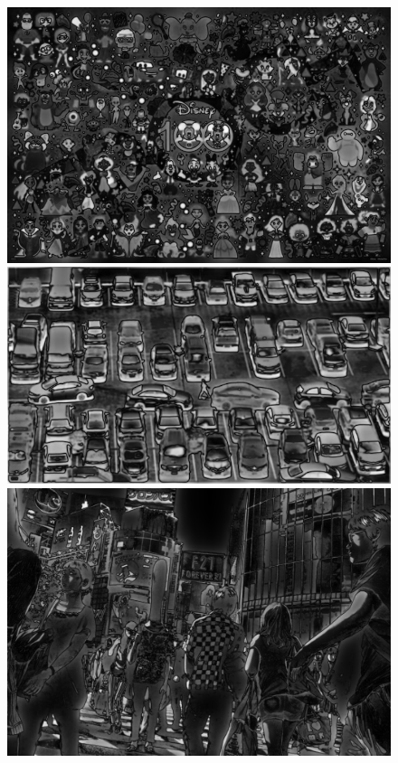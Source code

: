 \begin{figure}[H]
	\centering
	\begin{minipage}[b]{0.3\textwidth}
		\centering
		\includegraphics[width=\textwidth]{Graphics/disney-saliency.jpg}
	\end{minipage}
	\hfill
	\begin{minipage}[b]{0.3\textwidth}
		\centering
		\includegraphics[width=\textwidth]{Graphics/cars-saliency.jpg}
	\end{minipage}
	\hfill
	\begin{minipage}[b]{0.3\textwidth}
		\centering
		\includegraphics[width=\textwidth]{Graphics/japan-saliency.jpg}

\end{minipage}
\end{figure}
